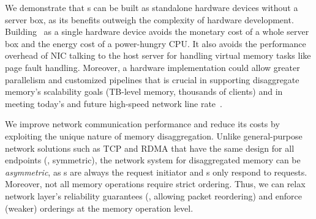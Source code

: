 We demonstrate that \MN{}s can be built as standalone hardware devices without a server box,
as its benefits outweigh the complexity of hardware development.
Building \MN\ as a single hardware device avoids the monetary cost of a whole server box and the energy cost of a power-hungry CPU.
It also avoids the performance overhead of NIC talking to the host server for handling virtual memory tasks like page fault handling.
Moreover, a hardware implementation could allow greater parallelism and customized pipelines
that is crucial in supporting disaggregate memory's scalability goals (TB-level memory, thousands of clients)
and in meeting today's and future high-speed network line rate~\cite{TONIC}.

We improve network communication performance and reduce its costs by 
exploiting the unique nature of memory disaggregation. %
Unlike general-purpose network solutions such as TCP and RDMA that have the same design for all endpoints (\ie, symmetric),
the network system for disaggregated memory can be {\em asymmetric}, as \CN{}s are always the request initiator and \MN{}s only respond to requests.
Moreover, not all memory operations require strict ordering.
Thus, we can relax network layer's reliability guarantees (\eg, allowing packet reordering)
and enforce (weaker) orderings at the memory operation level.

